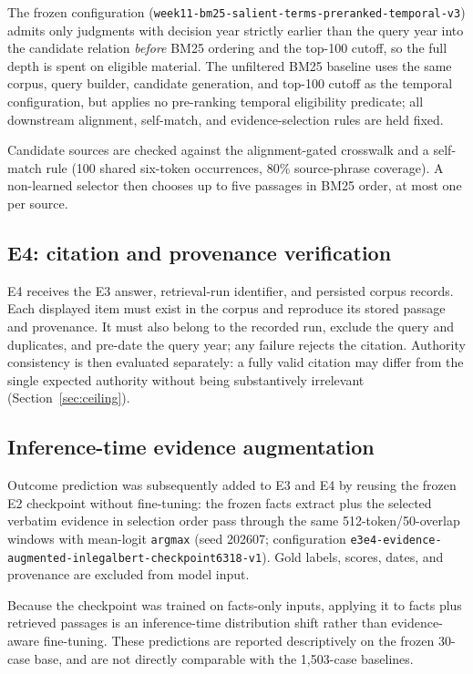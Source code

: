 \documentclass[conference]{IEEEtran}
\begin{document}
The frozen configuration (\texttt{week11-\allowbreak bm25-\allowbreak salient-\allowbreak terms-\allowbreak preranked-\allowbreak temporal-\allowbreak v3}) admits only judgments with decision year strictly earlier than the
query year into the candidate relation \emph{before} BM25 ordering and the
top-100 cutoff, so the full depth is spent on eligible material. The unfiltered BM25 baseline uses the same corpus, query builder, candidate generation, and top-100 cutoff as the temporal configuration, but applies no pre-ranking temporal eligibility predicate; all downstream alignment, self-match, and evidence-selection rules are held fixed.

Candidate sources are checked against the alignment-gated crosswalk and a
self-match rule (100 shared six-token occurrences, 80\%
source-phrase coverage). A non-learned selector then chooses up
to five passages in BM25 order, at most one per source.

\subsection{E4: citation and provenance verification}

E4 receives the E3 answer, retrieval-run identifier, and
persisted corpus records. Each displayed item must exist in the
corpus and reproduce its stored passage and provenance. It must also belong to the recorded
run, exclude the query and duplicates, and pre-date the
query year; any failure rejects the citation. Authority consistency is then
evaluated separately: a fully valid citation may differ from the single
expected authority without being substantively irrelevant (Section~\ref{sec:ceiling}).

\subsection{Inference-time evidence augmentation}

Outcome prediction was subsequently added to E3 and E4 by reusing the frozen E2
checkpoint without fine-tuning: the frozen
facts extract plus the selected verbatim evidence in selection order pass through
the same 512-token/50-overlap windows with mean-logit \texttt{argmax} (seed
202607; configuration
\texttt{e3e4-\allowbreak evidence-\allowbreak augmented-\allowbreak inlegalbert-\allowbreak checkpoint6318-\allowbreak v1}).
Gold labels, scores, dates, and provenance are excluded from model input.

Because the checkpoint was trained on
facts-only inputs, applying it to facts plus retrieved passages is an
inference-time distribution shift rather than evidence-aware fine-tuning. These
predictions are reported descriptively on the frozen 30-case
base, and are
not directly comparable with the 1{,}503-case baselines.
\end{document}
